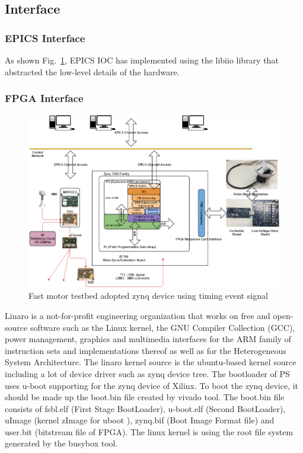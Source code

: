 \documentclass[a4paper,
              ]{jacow}
\begin{document}
\subsection{Interface}

\subsubsection{EPICS Interface} 
As shown Fig.~\ref{stepper}, EPICS IOC has implemented using the libiio library that abstracted the low-level details of the hardware.

\subsubsection{FPGA Interface}


\begin{figure}[!tbh]
    \centering
    \includegraphics*[width=\textwidth,height=0.7\textwidth]{motor-testbed}
    \caption{Fast motor testbed adopted zynq device using timing event signal}
    \label{stepper}
\end{figure}

\hfil\break

Linaro is a not-for-profit engineering organization that works on free and open-source software such as the Linux kernel, the GNU Compiler Collection (GCC), power management, graphics and multimedia interfaces for the ARM family of instruction sets and implementations thereof as well as for the Heterogeneous System Architecture\cite{linaro}.   
The linaro kernel source is the ubuntu-based kernel source including a lot of device driver such as zynq device tree.
The bootloader of PS uses u-boot\cite{u-boot} supporting for the zynq device of Xilinx. To boot the zynq device, it should be made up the boot.bin file created by vivado\cite{vivado} tool. The boot.bin\cite{boot-bin} file consists of fsbl.elf (First Stage BootLoader), u-boot.elf (Second BootLoader), uImage (kernel zImage for uboot ), zynq.bif (Boot Image Format file) and user.bit (bitstream file of FPGA). The linux kernel is using the root file system generated by the busybox\cite{busybox} tool.
\end{document}
